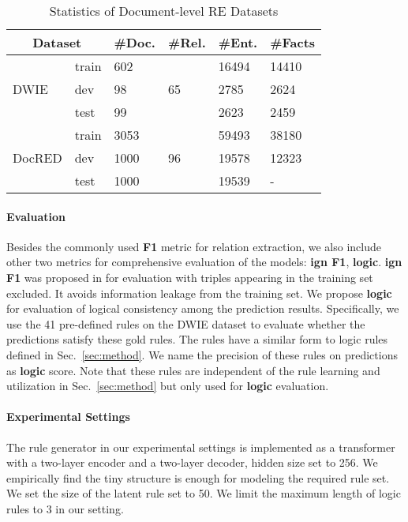 \documentclass[11pt]{article}
\begin{document}
\begin{table}[t]
    \small
    \centering
    \begin{tabular}{llllll}
    \toprule
    \multicolumn{2}{c}{\bf Dataset} & \bf \#Doc. & \bf \#Rel. & \bf \#Ent. & \bf \#Facts \\ \midrule
    \multirow{3}{*}{DWIE} & train & 602 & \multirow{3}{*}{65} & 16494 & 14410  \\
    ~ & dev & 98 & ~ & 2785 & 2624 \\
    ~ & test & 99 & ~ & 2623 & 2459 \\ \midrule
    \multirow{3}{*}{DocRED} & train & 3053 & \multirow{3}{*}{96} & 59493 & 38180  \\
    ~ & dev & 1000 & ~ & 19578 & 12323 \\
    ~ & test & 1000 & ~ & 19539 & - \\ \bottomrule
    \end{tabular}
    \caption{Statistics of Document-level RE Datasets}
    \label{tab:dataset}
\end{table} 

\paragraph{Evaluation}
Besides the commonly used \textbf{F1} metric for relation extraction, we also include other two metrics for comprehensive evaluation of the models: \textbf{ign F1}, \textbf{logic}. \textbf{ign F1} was proposed in \cite{yao-etal-2019-docred} for evaluation with triples appearing in the training set excluded. It avoids information leakage from the training set. We propose \textbf{logic} for evaluation of logical consistency among the prediction results. Specifically, we use the 41 pre-defined rules on the DWIE dataset to evaluate whether the predictions satisfy these gold rules. The rules have a similar form to logic rules defined in Sec.~\ref{sec:method}. We name the precision of these rules on predictions as \textbf{logic} score. Note that these rules are independent of the rule learning and utilization in Sec.~\ref{sec:method} but only used for \textbf{logic} evaluation.

\paragraph{Experimental Settings}
The rule generator in our experimental settings is implemented as a transformer with a two-layer encoder and a two-layer decoder, hidden size set to 256. We empirically find the tiny structure is enough for modeling the required rule set. We set the size of the latent rule set  to 50. We limit the maximum length of logic rules to 3 in our setting.
\end{document}

